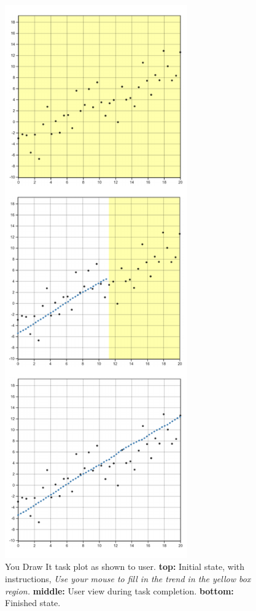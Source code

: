 \documentclass[
]{jds}
\begin{document}
\begin{figure}

{\centering \includegraphics[width=0.7\textwidth,height=\textheight]{./images/fig-you-draw-it-task-plot-1.pdf}

}

\caption{\label{fig-you-draw-it-task-plot}You Draw It task plot as shown
to user. \textbf{top:} Initial state, with instructions,
\textit{Use your mouse to fill in the trend in the yellow box region.}
\textbf{middle:} User view during task completion. \textbf{bottom:}
Finished state.}

\end{figure}
\end{document}
